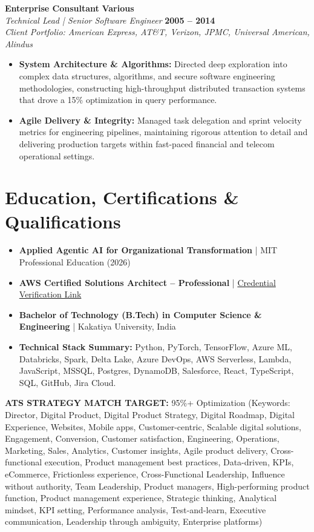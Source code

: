 \documentclass[9pt, letterpaper]{extarticle}
\begin{document}
\vspace{6pt}

\textbf{Enterprise Consultant} \hfill \textbf{Various} \\
\textit{Technical Lead | Senior Software Engineer} \hfill \textbf{2005 -- 2014} \\
\small\textit{Client Portfolio: American Express, AT\&T, Verizon, JPMC, Universal American, Alindus}
\begin{itemize}
    \item \textbf{System Architecture \& Algorithms:} Directed deep exploration into complex data structures, algorithms, and secure software engineering methodologies, constructing high-throughput distributed transaction systems that drove a 15\% optimization in query performance.
    \item \textbf{Agile Delivery \& Integrity:} Managed task delegation and sprint velocity metrics for engineering pipelines, maintaining rigorous attention to detail and delivering production targets within fast-paced financial and telecom operational settings.
\end{itemize}

\section{Education, Certifications \& Qualifications}
\begin{itemize}
    \item \textbf{Applied Agentic AI for Organizational Transformation} | MIT Professional Education (2026)
    \item \textbf{AWS Certified Solutions Architect -- Professional} | \href{https://www.credly.com/badges/7ef67d8d-67f2-4036-a8bf-8bbe73098a1f/linked_in?t=teze8g}{Credential Verification Link}
    \item \textbf{Bachelor of Technology (B.Tech) in Computer Science \& Engineering} | Kakatiya University, India
    \item \textbf{Technical Stack Summary:} Python, PyTorch, TensorFlow, Azure ML, Databricks, Spark, Delta Lake, Azure DevOps, AWS Serverless, Lambda, JavaScript, MSSQL, Postgres, DynamoDB, Salesforce, React, TypeScript, SQL, GitHub, Jira Cloud.
\end{itemize}

\footnotesize \textbf{ATS STRATEGY MATCH TARGET:} 95\%+ Optimization (Keywords: Director, Digital Product, Digital Product Strategy, Digital Roadmap, Digital Experience, Websites, Mobile apps, Customer-centric, Scalable digital solutions, Engagement, Conversion, Customer satisfaction, Engineering, Operations, Marketing, Sales, Analytics, Customer insights, Agile product delivery, Cross-functional execution, Product management best practices, Data-driven, KPIs, eCommerce, Frictionless experience, Cross-Functional Leadership, Influence without authority, Team Leadership, Product managers, High-performing product function, Product management experience, Strategic thinking, Analytical mindset, KPI setting, Performance analysis, Test-and-learn, Executive communication, Leadership through ambiguity, Enterprise platforms)
\end{document}
